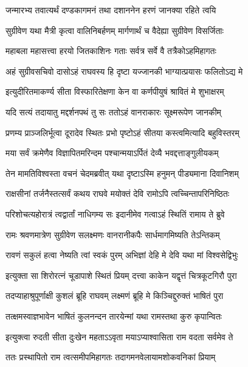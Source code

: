 \twolineshloka
{जन्मारभ्य तवात्यर्थं दण्डकागमनं तथा}
{दशाननेन हरणं जानक्या रहिते त्वयि} %

\twolineshloka
{सुग्रीवेण यथा मैत्री कृत्वा वालिनिबर्हणम्}
{मार्गणार्थं च वैदेह्या सुग्रीवेण विसर्जिताः} %

\twolineshloka
{महाबला महासत्त्वा हरयो जितकाशिनः}
{गताः सर्वत्र सर्वे वै तत्रैकोऽहमिहागतः} %

\twolineshloka
{अहं सुग्रीवसचिवो दासोऽहं राघवस्य हि}
{दृष्टा यज्जानकी भाग्यात्प्रयासः फलितोऽद्य मे} %

\twolineshloka
{इत्युदीरितमाकर्ण्य सीता विस्फारितेक्षणा}
{केन वा कर्णपीयुषं श्रावितं मे शुभाक्षरम्} %

\twolineshloka
{यदि सत्यं तदायातु मद्दर्शनपथं तु सः}
{ततोऽहं वानराकारः सूक्ष्मरूपेण जानकीम्} %

\twolineshloka
{प्रणम्य प्राञ्जलिर्भूत्वा दूरादेव स्थितः प्रभो}
{पृष्टोऽहं सीतया कस्त्वमित्यादि बहुविस्तरम्} %

\twolineshloka
{मया सर्वं क्रमेणैव विज्ञापितमरिन्दम}
{पश्चान्मयाऽर्पितं देव्यै भवद्दत्ताङ्गुलीयकम्} %

\twolineshloka
{तेन मामतिविश्वस्ता वचनं चेदमब्रवीत्}
{यथा दृष्टाऽस्मि हनुमन् पीड्यमाना दिवानिशम्} %

\twolineshloka
{राक्षसीनां तर्जनैस्तत्सर्वं कथय राघवे}
{मयोक्तं देवि रामोऽपि त्वच्चिन्तापरिनिष्ठितः} %

\twolineshloka
{परिशोचत्यहोरात्रं त्वद्वार्तां नाधिगम्य सः}
{इदानीमेव गत्वाऽहं स्थितिं रामाय ते ब्रुवे} %

\twolineshloka
{रामः श्रवणमात्रेण सुग्रीवेण सलक्ष्मणः}
{वानरानीकपैः सार्धमागमिष्यति तेऽन्तिकम्} %

\twolineshloka
{रावणं सकुलं हत्वा नेष्यति त्वां स्वकं पुरम्}
{अभिज्ञां देहि मे देवि यथा मां विश्वसेद्विभुः} %

\twolineshloka
{इत्युक्ता सा शिरोरत्नं चूडापाशे स्थितं प्रियम्}
{दत्त्वा काकेन यद्वृत्तं चित्रकूटगिरौ पुरा} %

\twolineshloka
{तदप्याहाश्रुपूर्णाक्षी कुशलं ब्रूहि राघवम्}
{लक्ष्मणं ब्रूहि मे किञ्चिद्दुरुक्तं भाषितं पुरा} %

\twolineshloka
{तत्क्षमस्वाज्ञभावेन भाषितं कुलनन्दन}
{तारयेन्मां यथा रामस्तथा कुरु कृपान्वितः} %

\twolineshloka
{इत्युक्त्वा रुदती सीता दुःखेन महताऽऽवृता}
{मयाऽप्याश्वासिता राम वदता सर्वमेव ते} %

\twolineshloka
{ततः प्रस्थापितो राम त्वत्समीपमिहागतः}
{तदागमनवेलायामशोकवनिकां प्रियाम्} %

